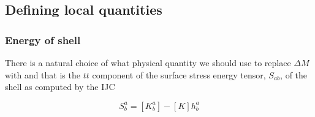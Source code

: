 \documentclass[aps,showpacs,twocolumn,floats,prd,superscriptaddress,nofootinbib]{revtex4-1}
\begin{document}
%
%

\subsection{Defining local quantities}

\subsubsection{Energy of shell}

There is a natural choice of what physical quantity we should use to replace $\Delta M$ with and that is the $tt$ component of the surface stress energy tensor, $S_{ab}$, of the shell as computed by the IJC

\begin{equation}
	S^a_b =  [K^a_b] - [K]h^a_b
\end{equation}
\end{document}
